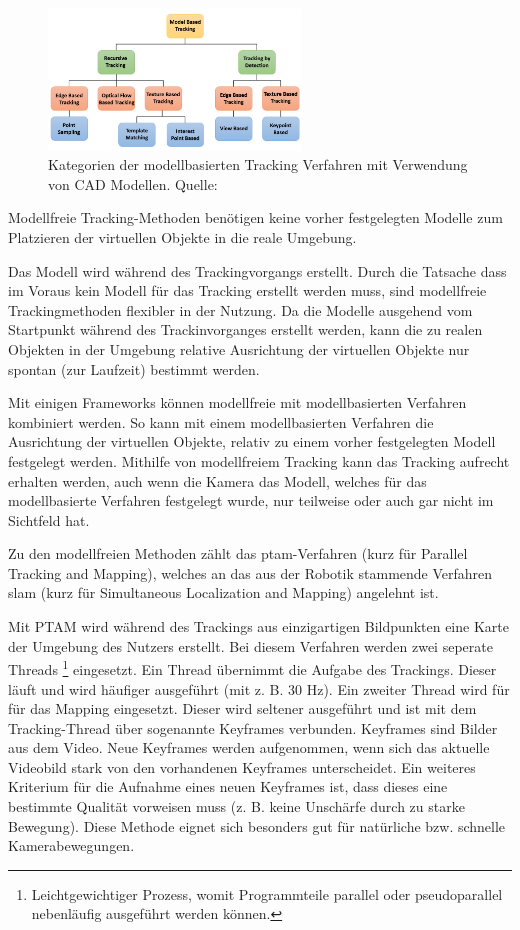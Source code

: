 \begin{figure}[H]
	\centering
	\includegraphics[width=0.6\textwidth]{resources/fundamentals/model_based_tracking_taxonomies.png}
	\caption{Kategorien der modellbasierten Tracking Verfahren mit Verwendung von CAD Modellen. Quelle: \cite[S.~86]{Lowney2016}}
	\label{img:modellbased_categories}
\end{figure} 

Modellfreie Tracking-Methoden benötigen keine vorher festgelegten Modelle zum Platzieren der virtuellen Objekte in die reale Umgebung. 

Das Modell wird während des Trackingvorgangs erstellt. Durch die Tatsache dass im Voraus kein Modell für das Tracking erstellt werden muss, sind modellfreie Trackingmethoden flexibler in der Nutzung. Da die Modelle ausgehend vom Startpunkt während des Trackinvorganges erstellt werden, kann die zu realen Objekten in der Umgebung relative Ausrichtung der virtuellen Objekte nur spontan (zur Laufzeit) bestimmt werden. \cite[S.~106]{DieterSchmalstieg2016}

Mit einigen Frameworks können modellfreie mit modellbasierten Verfahren kombiniert werden. So kann mit einem modellbasierten Verfahren die Ausrichtung der virtuellen Objekte, relativ zu einem vorher festgelegten Modell festgelegt werden. Mithilfe von modellfreiem Tracking kann das Tracking aufrecht erhalten werden, auch wenn die Kamera das Modell, welches für das modellbasierte Verfahren festgelegt wurde, nur teilweise oder auch gar nicht im Sichtfeld hat.

Zu den modellfreien Methoden zählt das \gls{ptam}-Verfahren (kurz für  Parallel Tracking and Mapping), welches an das aus der Robotik stammende Verfahren \gls{slam} (kurz für Simultaneous Localization and Mapping) angelehnt ist. 

Mit PTAM wird während des Trackings aus einzigartigen Bildpunkten eine Karte der Umgebung des Nutzers erstellt. Bei diesem Verfahren werden zwei seperate Threads \footnote{Leichtgewichtiger Prozess, womit Programmteile parallel oder pseudoparallel nebenläufig ausgeführt werden können.} eingesetzt. Ein Thread übernimmt die Aufgabe des Trackings. Dieser läuft und wird häufiger ausgeführt (mit z. B. 30 Hz). Ein zweiter Thread wird für für das Mapping eingesetzt. Dieser wird seltener ausgeführt und ist mit dem Tracking-Thread über sogenannte Keyframes verbunden. Keyframes sind Bilder aus dem Video. Neue Keyframes werden aufgenommen, wenn sich das aktuelle Videobild stark von den vorhandenen Keyframes unterscheidet. Ein weiteres Kriterium für die Aufnahme eines neuen Keyframes ist, dass dieses eine bestimmte Qualität vorweisen muss (z. B. keine Unschärfe durch zu starke Bewegung). Diese Methode eignet sich besonders gut für natürliche bzw. schnelle Kamerabewegungen. \cite{Klein2007}


